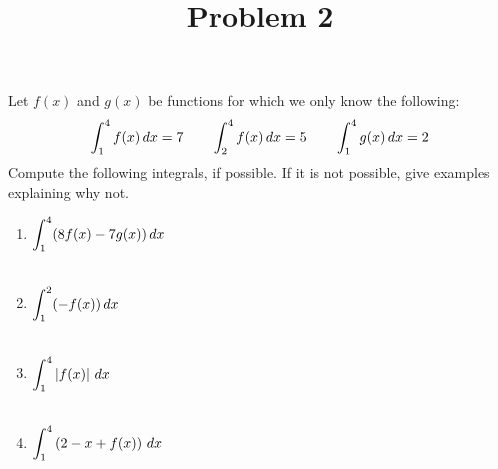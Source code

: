 \documentclass{ximera}
\title[Problem 2]{Problem 2}
\begin{document}
\begin{abstract} \end{abstract}
\maketitle

\begin{problem}
Let $f(x)$ and $g(x)$ be functions for which we only know the following:
$$ \displaystyle \int_1^4 f(x)\,d x = 7	\qquad	\displaystyle \int_2^4 f(x)\,d x = 5	\qquad	\displaystyle \int_1^4 g(x)\,d x = 2 $$
Compute the following integrals, if possible.  If it is not possible, give examples explaining why not.
	\begin{enumerate}
	
	\item  $\displaystyle \int_1^4 (8f(x) - 7g(x))\,d x $\\ \\

	\item  $\displaystyle \int_1^2 (-f(x)) \,d x $\\ \\

	\item  $\displaystyle \int_1^4 \left| f(x) \right| \,d x$\\ \\

	\item  $\displaystyle \int_1^4 \left( 2 - x + f(x) \right) \,d x$
		
\end{enumerate}
\end{problem}
\end{document}
